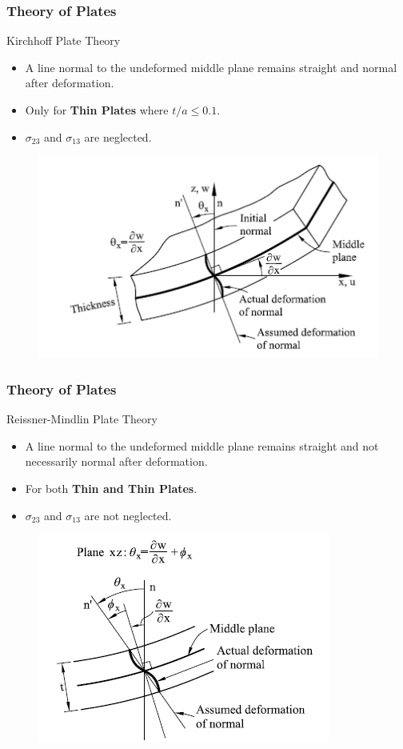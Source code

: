 \documentclass[9pt]{beamer}
\begin{document}
\begin{frame}
\frametitle{Theory of Plates}
\begin{block}{Kirchhoff Plate Theory}
\begin{itemize}
\item A line normal to the undeformed middle plane remains straight and normal after deformation.
\item Only for \textbf{Thin Plates} where $t/a \leq 0.1 $.
\item $\sigma_{23}$ and $\sigma_{13}$ are neglected.
\end{itemize}
\end{block}


\begin{figure}[h!]
  \includegraphics[width=0.6\linewidth,trim={0 0 0 0},clip]{Kplate.png}
\end{figure}

\end{frame}


\begin{frame}
\frametitle{Theory of Plates}

\begin{block}{Reissner-Mindlin Plate Theory}
\begin{itemize}
\item A line normal to the undeformed middle plane remains straight and not necessarily normal after deformation.
\item For both \textbf{Thin and Thin Plates}.
\item $\sigma_{23}$ and $\sigma_{13}$ are not neglected.
\end{itemize}
\end{block}


\begin{figure}[h!]
  \includegraphics[width=0.6\linewidth,trim={0 0 0 0},clip]{RMplate.png}
\end{figure}

\end{frame}
\end{document}
